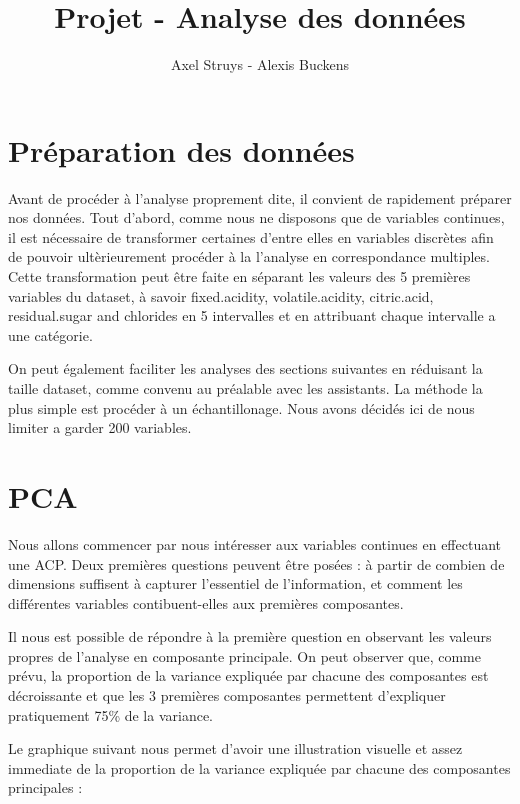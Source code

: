 \documentclass[11pt,a4paper]{article}
\author{Axel Struys - Alexis Buckens}
\title{Projet - Analyse des données}
\begin{document}
\maketitle
\section{Préparation des données}

Avant de procéder à l'analyse proprement dite, il convient de rapidement préparer nos données. Tout d'abord, comme nous ne disposons que de variables continues, il est nécessaire de transformer certaines d'entre elles en variables discrètes afin de pouvoir ultèrieurement procéder à la l'analyse en correspondance multiples. Cette transformation peut être faite en séparant les valeurs des 5 premières variables du dataset, à savoir fixed.acidity, volatile.acidity, citric.acid, residual.sugar and chlorides en 5 intervalles et en attribuant chaque intervalle a une catégorie. 

On peut également faciliter les analyses des sections suivantes en réduisant la taille dataset, comme convenu au préalable avec les assistants. La méthode la plus simple est procéder à un échantillonage. Nous avons décidés ici de nous limiter a garder 200 variables.

\section{PCA}

Nous allons commencer par nous intéresser aux variables continues en effectuant une ACP. Deux premières questions peuvent être posées : à partir de combien de dimensions suffisent à capturer l'essentiel de l'information, et comment les différentes variables contibuent-elles aux premières composantes.

Il nous est possible de répondre à la première question en observant les valeurs propres de l'analyse en composante principale. On peut observer que, comme prévu, la proportion de la variance expliquée par chacune des composantes est décroissante et que les 3 premières composantes permettent d'expliquer pratiquement 75\% de la variance.

Le graphique suivant nous permet d'avoir une illustration visuelle et assez immediate de la proportion de la variance expliquée par chacune des composantes principales :
\end{document}
